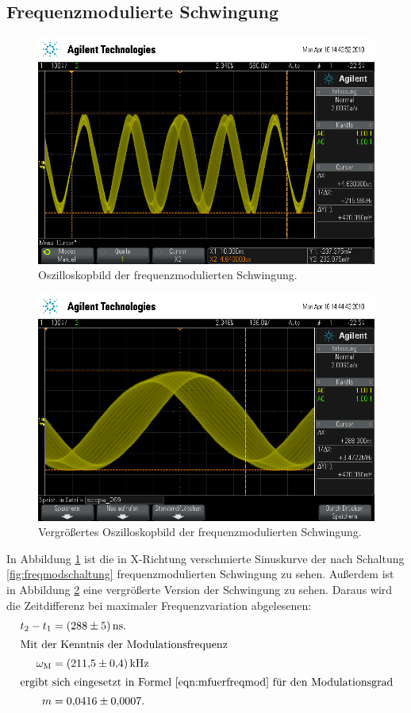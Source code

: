 \subsection{Frequenzmodulierte Schwingung}

\begin{figure}[h]
  \centering
  \includegraphics[width=.9\textwidth]{Oszi_Pics/freqModRing.png}
  \caption{Oszilloskopbild der frequenzmodulierten Schwingung.}
  \label{fig:freqModRing}
\end{figure}

\begin{figure}[h]
  \centering
  \includegraphics[width=.9\textwidth]{Oszi_Pics/freqModZoom.png}
  \caption{Vergrößertes Oszilloskopbild der frequenzmodulierten Schwingung.}
  \label{fig:freqModZoom}
\end{figure}

In Abbildung \ref{fig:freqModRing} ist die in X-Richtung verschmierte Sinuskurve der nach Schaltung \ref{fig:freqmodschaltung} frequenzmodulierten Schwingung zu sehen. Außerdem ist in Abbildung \ref{fig:freqModZoom} eine vergrößerte Version der Schwingung zu sehen. Daraus wird die Zeitdifferenz bei maximaler Frequenzvariation abgelesenen:
\begin{align*}
  t_2 - t_1 &= \SI{288(5)}{\nano\second}.\\
\intertext{Mit der Kenntnis der Modulationsfrequenz}
  \omega_\text{M} &= \SI{211.5(4)}{\kilo\hertz}\\
\intertext{ergibt sich eingesetzt in Formel \eqref{eqn:mfuerfreqmod} für den Modulationsgrad}
  m &= \num{0.0416(7)}.
\end{align*}


